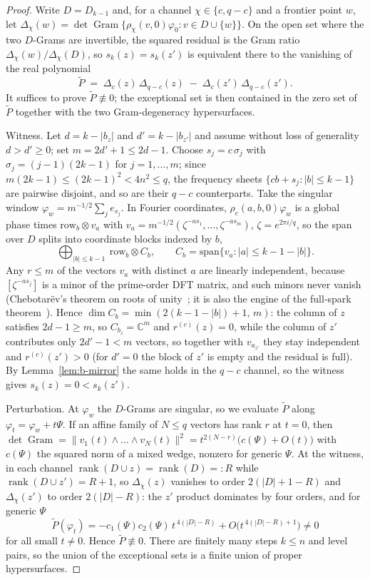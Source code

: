 \documentclass[11pt]{article}
\begin{document}
\begin{proof}
Write $D=D_{k-1}$ and, for a channel $\chi\in\{c,q-c\}$ and a frontier point $w$, let
$\Delta_\chi(w)=\det\operatorname{Gram}\{\rho_\chi(v,0)\varphi_0:v\in D\cup\{w\}\}$.
On the open set where the two $D$-Grams are invertible, the squared residual is the Gram ratio
$\Delta_\chi(w)/\Delta_\chi(D)$, so $s_k(z)=s_k(z')$ is equivalent there to the vanishing of the real
polynomial
\[
\widetilde P \;=\; \Delta_c(z)\,\Delta_{q-c}(z)\;-\;\Delta_c(z')\,\Delta_{q-c}(z') .
\]
It suffices to prove $\widetilde P\not\equiv0$; the exceptional set is then contained in the zero set of
$\widetilde P$ together with the two Gram-degeneracy hypersurfaces.

Witness.
Let $d=k-|b_z|$ and $d'=k-|b_{z'}|$ and assume without loss of generality $d>d'\ge0$; set $m=2d'+1\le2d-1$.
Choose $s_j=c\,\sigma_j$ with $\sigma_j=(j-1)(2k-1)$ for $j=1,\dots,m$; since
$m(2k-1)\le(2k-1)^2<4n^2\le q$, the frequency sheets $\{cb+s_j:|b|\le k-1\}$ are pairwise disjoint, and so
are their $q-c$ counterparts.
Take the singular window $\varphi_w=m^{-1/2}\sum_j e_{s_j}$.
In Fourier coordinates, $\rho_c(a,b,0)\varphi_w$ is a global phase times $\mathrm{row}_b\otimes v_a$ with
$v_a=m^{-1/2}(\zeta^{-as_1},\dots,\zeta^{-as_m})$, $\zeta=e^{2\pi i/q}$, so the span over $D$ splits into
coordinate blocks indexed by $b$,
\[
\bigoplus_{|b|\le k-1}\ \mathrm{row}_b\otimes C_b,
\qquad
C_b=\mathrm{span}\{v_a : |a|\le k-1-|b|\}.
\]
Any $r\le m$ of the vectors $v_a$ with distinct $a$ are linearly independent, because
$[\zeta^{-as_j}]$ is a minor of the prime-order DFT matrix, and such minors never vanish (Chebotar\"ev's
theorem on roots of unity~\cite{EvansIsaacs1976}; it is also the engine of the full-spark
theorem~\cite{Lawrence2005}).
Hence $\dim C_b=\min(2(k-1-|b|)+1,\,m)$: the column of $z$ satisfies $2d-1\ge m$, so $C_{b_z}=\mathbb{C}^m$
and $r^{(c)}(z)=0$, while the column of $z'$ contributes only $2d'-1<m$ vectors, so together with
$v_{a_{z'}}$ they stay independent and $r^{(c)}(z')>0$ (for $d'=0$ the block of $z'$ is empty and the
residual is full).
By Lemma~\ref{lem:b-mirror} the same holds in the $q-c$ channel, so the witness gives $s_k(z)=0<s_k(z')$.

Perturbation.
At $\varphi_w$ the $D$-Grams are singular, so we evaluate $\widetilde P$ along $\varphi_t=\varphi_w+t\Psi$.
If an affine family of $N\le q$ vectors has rank $r$ at $t=0$, then
$\det\operatorname{Gram}=\|v_1(t)\wedge\dots\wedge v_N(t)\|^2=t^{2(N-r)}\bigl(c(\Psi)+O(t)\bigr)$ with
$c(\Psi)$ the squared norm of a mixed wedge, nonzero for generic $\Psi$.
At the witness, in each channel $\operatorname{rank}(D\cup z)=\operatorname{rank}(D)=:R$ while
$\operatorname{rank}(D\cup z')=R+1$, so $\Delta_\chi(z)$ vanishes to order $2(|D|+1-R)$ and
$\Delta_\chi(z')$ to order $2(|D|-R)$: the $z'$ product dominates by four orders, and for generic $\Psi$
\[
\widetilde P(\varphi_t)=-c_1(\Psi)c_2(\Psi)\,t^{\,4(|D|-R)}+O\bigl(t^{\,4(|D|-R)+1}\bigr)\neq0
\]
for all small $t\neq0$.
Hence $\widetilde P\not\equiv0$.
There are finitely many steps $k\le n$ and level pairs, so the union of the exceptional sets is a finite
union of proper hypersurfaces.
\end{proof}
\end{document}
